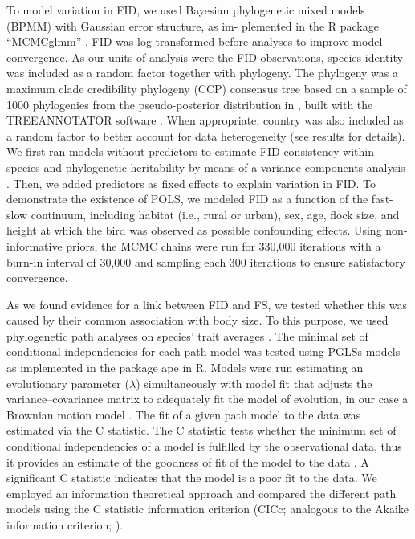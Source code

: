 To model variation in FID, we used Bayesian phylogenetic
mixed models (BPMM) with Gaussian error structure, as im-
plemented in the R package ``MCMCglmm'' \citep{Hadfield2010, Hadfield2010a}. 
FID was log transformed before
analyses to improve model convergence. As our units of
analysis were the FID observations, species identity was included
as a random factor together with phylogeny. The phylogeny
was a maximum clade credibility phylogeny (CCP)
consensus tree based on a sample of 1000 phylogenies from
the pseudo-posterior distribution in \citet{Jetz2012}, built with
the TREEANNOTATOR software \citep{Drummond2012}.
When appropriate, country was also included as a random factor
to better account for data heterogeneity (see results for details).
We first ran models without predictors to estimate FID
consistency within species and phylogenetic heritability by
means of a variance components analysis \citep{Housworth2004}. 
Then, we added predictors as fixed effects to explain
variation in FID. To demonstrate the existence of POLS, we
modeled FID as a function of the fast-slow continuum, including
habitat (i.e., rural or urban), sex, age, flock size, and height
at which the bird was observed as possible confounding effects.
Using non-informative priors, the MCMC chains were run for
330,000 iterations with a burn-in interval of 30,000 and sampling
each 300 iterations to ensure satisfactory convergence.

As we found evidence for a link between FID and FS, we
tested whether this was caused by their common association
with body size. To this purpose, we used phylogenetic path
analyses on species’ trait averages \citep{VonHardenberg2013, Gonzalez-Voyer2014}. 
The minimal set of conditional independencies for each
path model \citep{VonHardenberg2013} was
tested using PGLSs models as implemented in the package ape
\citep{Paradis2004} in R. Models were run estimating an evolutionary
parameter ($\lambda$) simultaneously with model fit that adjusts
the variance–covariance matrix to adequately fit the model
of evolution, in our case a Brownian motion model \citep{Freckleton2002}. 
The fit of a given path model to the data was
estimated via the C statistic. The C statistic tests whether the
minimum set of conditional independencies of a model is fulfilled
by the observational data, thus it provides an estimate of
the goodness of fit of the model to the data \citep{Shipley2013}. A
significant C statistic indicates that the model is a poor fit to the
data. We employed an information theoretical approach and
compared the different path models using the C statistic information
criterion (CICc; analogous to the Akaike information
criterion; \citet{VonHardenberg2013}).

